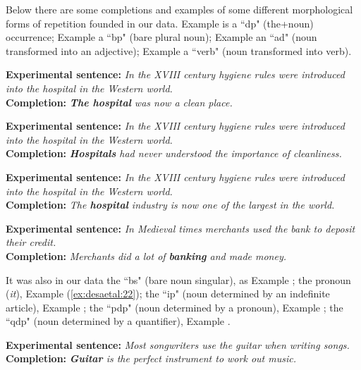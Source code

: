 \documentclass[output=paper,
modfonts
]{langscibook}
\begin{document}
Below there are some completions and examples of some different morphological forms of repetition founded in our data. Example  is a “dp" (the+noun) occurrence; Example  a “bp" (bare plural noun); Example  an “ad" (noun transformed into an adjective); Example  a “verb" (noun transformed into verb).

\ea \label{ex:desaetal:17}
\textbf{Experimental sentence:} \textit{In the XVIII century hygiene rules were introduced into the	hospital in the Western world.}
\\ \textbf{Completion:} \textit{\textbf{The hospital} was now a clean place.} 
\z

\ea\label{ex:desaetal:18}
\textbf{Experimental sentence:} \textit{In the XVIII century hygiene rules were introduced into the hospital in the Western world.}
\\ \textbf{Completion:} \textit{\textbf{Hospitals} had never understood the importance of cleanliness.} 
\z

\ea \label{ex:desaetal:19}
\textbf{Experimental sentence:} \textit{In the XVIII century hygiene rules were introduced into the hospital in the Western world.}
\\ \textbf{Completion:} \textit{The \textbf{hospital} industry is now one of the largest in the world.} 
\z

\ea \label{ex:desaetal:20}
\textbf{Experimental sentence:} \textit{In Medieval times merchants used the bank to deposit their credit.}\largerpage
\\ \textbf{Completion:} \textit{Merchants did a lot of  \textbf{banking} and made money.} 
\z

It was also in our data the “bs" (bare noun singular), as Example ; the pronoun (\textit{it}), Example (\ref{ex:desaetal:22}); the “ip" (noun determined by an indefinite article), Example ; the “pdp" (noun determined by a pronoun), Example ; the “qdp" (noun determined by a quantifier), Example .


\ea \label{ex:desaetal:21}
\textbf{Experimental sentence:} \textit{Most songwriters use the guitar when writing songs.}
\\ \textbf{Completion:} \textit{\textbf{Guitar} is the perfect instrument to work out music.} 
\z
\end{document}
